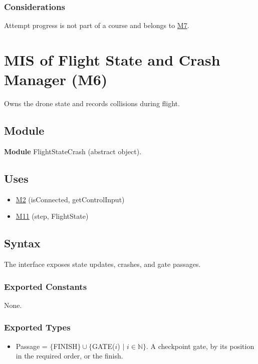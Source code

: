 \documentclass[12pt, titlepage]{article}
\newcommand{\Mref}[1]{\hyperref[sec:M#1]{M#1}}
\begin{document}
\subsubsection{Considerations}

Attempt progress is not part of a course and belongs to \Mref{7}.

\newpage
\section{MIS of Flight State and Crash Manager (M6)} \label{sec:M6}

Owns the drone state and records collisions during flight.

\subsection{Module}

\textbf{Module} FlightStateCrash (abstract object).

\subsection{Uses}

\begin{itemize}
\item \Mref{2} (isConnected, getControlInput)
\item \Mref{11} (step, FlightState)
\end{itemize}

\subsection{Syntax}

The interface exposes state updates, crashes, and gate passages.

\subsubsection{Exported Constants}

None.

\subsubsection{Exported Types}

\begin{itemize}
\item Passage = $\{$FINISH$\} \cup \{$GATE($i$) $|$ $i \in \mathbb{N}\}$. A
  checkpoint gate, by its position in the required order, or the finish.
\end{itemize}
\end{document}
